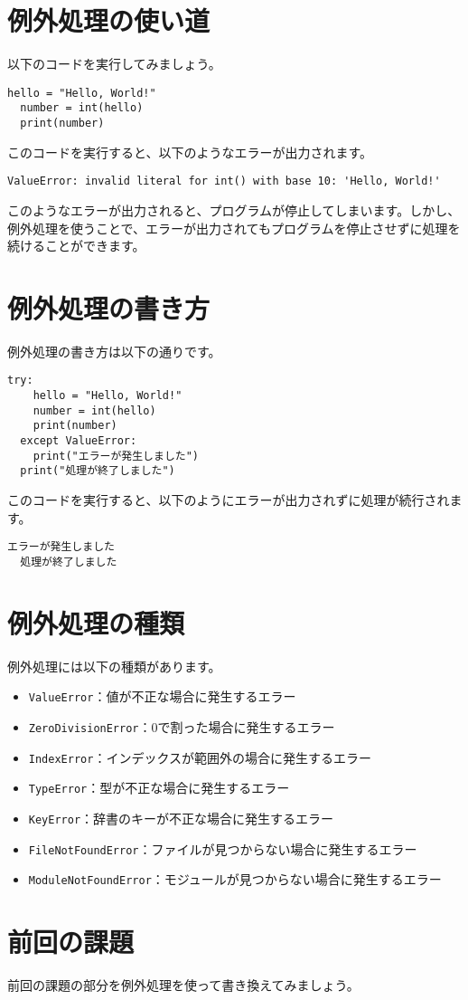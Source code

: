 \documentclass[a4paper,titlepage,dvipdfmx]{jarticle}
\begin{document}
\section{例外処理の使い道}
以下のコードを実行してみましょう。
\begin{lstlisting}[caption=例外処理の使い道,label=exception]
  hello = "Hello, World!"
  number = int(hello)
  print(number)
\end{lstlisting}
このコードを実行すると、以下のようなエラーが出力されます。
\begin{lstlisting}[caption=エラー,label=error]
  ValueError: invalid literal for int() with base 10: 'Hello, World!'
\end{lstlisting}
このようなエラーが出力されると、プログラムが停止してしまいます。しかし、例外処理を使うことで、エラーが出力されてもプログラムを停止させずに処理を続けることができます。
\section{例外処理の書き方}
例外処理の書き方は以下の通りです。
\begin{lstlisting}[caption=例外処理の書き方,label=exception]
  try:
    hello = "Hello, World!"
    number = int(hello)
    print(number)
  except ValueError:
    print("エラーが発生しました")
  print("処理が終了しました")
\end{lstlisting}
このコードを実行すると、以下のようにエラーが出力されずに処理が続行されます。
\begin{lstlisting}[caption=エラー,label=error]
  エラーが発生しました
  処理が終了しました
\end{lstlisting}

\section{例外処理の種類}
例外処理には以下の種類があります。
\begin{itemize}
  \item \texttt{ValueError}：値が不正な場合に発生するエラー
  \item \texttt{ZeroDivisionError}：0で割った場合に発生するエラー
  \item \texttt{IndexError}：インデックスが範囲外の場合に発生するエラー
  \item \texttt{TypeError}：型が不正な場合に発生するエラー
  \item \texttt{KeyError}：辞書のキーが不正な場合に発生するエラー
  \item \texttt{FileNotFoundError}：ファイルが見つからない場合に発生するエラー
  \item \texttt{ModuleNotFoundError}：モジュールが見つからない場合に発生するエラー
\end{itemize}

\section{前回の課題}
前回の課題の部分を例外処理を使って書き換えてみましょう。
\end{document}
